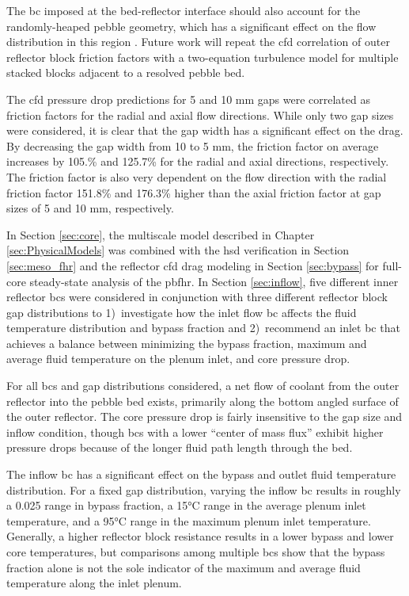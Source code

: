 The \gls{bc} imposed at the bed-reflector interface should also account for the randomly-heaped pebble geometry, which has a significant effect on the flow distribution in this region \cite{amini}.
Future work will repeat the \gls{cfd} correlation of outer reflector block friction factors with a two-equation turbulence model for multiple stacked blocks adjacent to a resolved pebble bed.

The \gls{cfd} pressure drop predictions for 5 and 10 \si{\milli\meter} gaps were correlated as friction factors for the radial and axial flow directions. While only two gap sizes were considered, it is clear that the gap width has a significant effect on the drag. By decreasing the gap width from 10 to 5 \si{\milli\meter}, the friction factor on average increases by 105.\% and 125.7\% for the radial and axial directions, respectively. The friction factor is also very dependent on the flow direction with the radial friction factor 151.8\% and 176.3\% higher than the axial friction factor at gap sizes of 5 and 10 \si{\milli\meter}, respectively. 

In Section \ref{sec:core}, the multiscale model described in Chapter \ref{sec:PhysicalModels} was combined with the \gls{hsd} verification in Section \ref{sec:meso_fhr} and the reflector \gls{cfd} drag modeling in Section \ref{sec:bypass} for full-core steady-state analysis of the \gls{pbfhr}. In Section \ref{sec:inflow}, five different inner reflector \glspl{bc} were considered in conjunction with three different reflector block gap distributions to 1)~investigate how the inlet flow \gls{bc} affects the fluid temperature distribution and bypass fraction and 2)~recommend an inlet \gls{bc} that achieves a balance between minimizing the bypass fraction, maximum and average fluid temperature on the plenum inlet, and core pressure drop.

For all \glspl{bc} and gap distributions considered, a net flow of coolant from the outer reflector into the pebble bed exists, primarily along the bottom angled surface of the outer reflector. The core pressure drop is fairly insensitive to the gap size and inflow condition, though \glspl{bc} with a lower ``center of mass flux'' exhibit higher pressure drops because of the longer fluid path length through the bed.

The inflow \gls{bc} has a significant effect on the bypass and outlet fluid temperature distribution. For a fixed gap distribution, varying the inflow \gls{bc} results in roughly a 0.025 range in bypass fraction, a 15\si{\celsius} range in the average plenum inlet temperature, and a 95\si{\celsius} range in the maximum plenum inlet temperature. Generally, a higher reflector block resistance results in a lower bypass and lower core temperatures, but comparisons among multiple \glspl{bc} show that the bypass fraction alone is not the sole indicator of the maximum and average fluid temperature along the inlet plenum. %

